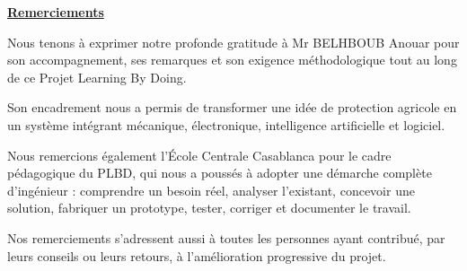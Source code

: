 ﻿\documentclass[11pt,a4paper,openany]{report}
\begin{document}
\tableofcontents
\listoffigures
\listoftables
\clearpage


{}

\vspace*{1cm}

\begin{tcolorbox}[
enhanced,
colback=white,
colframe=black,
boxrule=0.8pt,
arc=5mm,
width=\textwidth,
left=12mm,
right=12mm,
top=10mm,
bottom=10mm
]

\begin{center}
{\Huge\bfseries\underline{Remerciements}}
\end{center}

\vspace{0.6cm}

Nous tenons à exprimer notre profonde gratitude à Mr BELHBOUB Anouar pour son accompagnement, ses remarques et son exigence méthodologique tout au long de ce Projet Learning By Doing.

Son encadrement nous a permis de transformer une idée de protection agricole en un système intégrant mécanique, électronique, intelligence artificielle et logiciel.

\vspace{0.3cm}

Nous remercions également l'École Centrale Casablanca pour le cadre pédagogique du PLBD, qui nous a poussés à adopter une démarche complète d'ingénieur : comprendre un besoin réel, analyser l'existant, concevoir une solution, fabriquer un prototype, tester, corriger et documenter le travail.

\vspace{0.3cm}

Nos remerciements s'adressent aussi à toutes les personnes ayant contribué, par leurs conseils ou leurs retours, à l'amélioration progressive du projet.

\end{tcolorbox}
\end{document}
